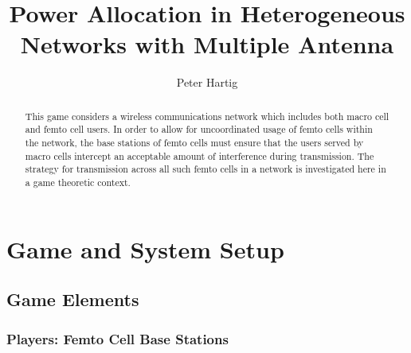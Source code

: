 \documentclass[12pt]{article}
\title{Power Allocation in Heterogeneous Networks with Multiple Antenna }
\author{Peter Hartig}
\begin{document}
\maketitle


\begin{abstract}
This game considers a wireless communications network which includes both macro cell and femto cell users. In order to allow for uncoordinated usage of femto cells within the network, the base stations of femto cells must ensure that the users served by macro cells intercept an acceptable amount of interference during transmission. The strategy for transmission across all such femto cells in a network is investigated here in a game theoretic context. 

\end{abstract}

\newpage
\tableofcontents
\newpage

\section{Game and System Setup}

\subsection{Game Elements}

\subsubsection{Players: Femto Cell Base Stations}
\end{document}
